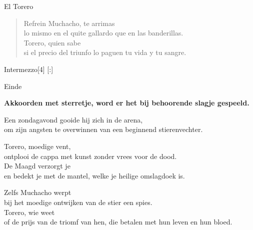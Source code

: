 \begin{song}{El Torero}
\begin{verse}{Refrein}
Muchacho, te arrimas\\
lo mismo en el quite gallardo que en las banderillas.\\
Torero,  quien sabe \\
si el precio del triunfo lo paguen tu vida y tu sangre.
\end{verse}

\begin{instrumental}{Intermezzo}[4]
   [:]
 
\end{instrumental}


\begin{instrumental}{Einde}
 
\end{instrumental}
\end{song}

\clearpage
\textbf{Akkoorden met sterretje, word er het bij behoorende slagje gespeeld.}\\

\begin{translation}
Een zondagavond gooide hij zich in de arena,\\
om zijn angsten te overwinnen van een beginnend stierenvechter.\vspace{\wlskip}

Torero, moedige vent,\\
ontplooi de cappa met kunst zonder vrees voor de dood.\\
De Maagd verzorgt je\\
en bedekt je met de mantel, welke je heilige omslagdoek is.\vspace{\wlskip}

Zelfs Muchacho werpt\\
bij het moedige ontwijken van de stier een spies.\\
Torero, wie weet\\
of de prijs van de triomf van hen, die betalen met hun leven en hun
bloed.
\end{translation}
